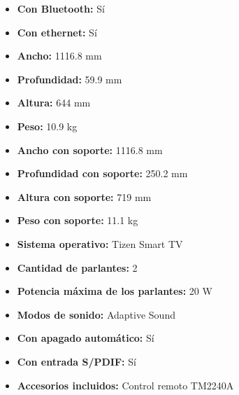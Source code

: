 \documentclass{article}
\begin{document}
\begin{adjustwidth}{2em}{}
\begin{itemize}
\begin{itemize}
    \item \textbf {Con Bluetooth:} Sí
    \item \textbf {Con ethernet:} Sí
    \item \textbf {Ancho:} 1116.8 mm
    \item \textbf {Profundidad:} 59.9 mm
    \item \textbf {Altura:} 644 mm
    \item \textbf {Peso:} 10.9 kg
    \item \textbf {Ancho con soporte:} 1116.8 mm
    \item \textbf {Profundidad con soporte:} 250.2 mm
    \item \textbf {Altura con soporte:} 719 mm
    \item \textbf {Peso con soporte:} 11.1 kg
    \item \textbf {Sistema operativo:} Tizen Smart TV
    \item \textbf {Cantidad de parlantes:} 2
    \item \textbf {Potencia máxima de los parlantes:} 20 W
    \item \textbf {Modos de sonido:} Adaptive Sound
    \item \textbf {Con apagado automático:} Sí
    \item \textbf {Con entrada S/PDIF:} Sí
    \item \textbf {Accesorios incluidos:} Control remoto TM2240A
        \end{itemize}
    \end{itemize}

    \vspace{1\baselineskip} %
    \end{adjustwidth}
\end{document}
